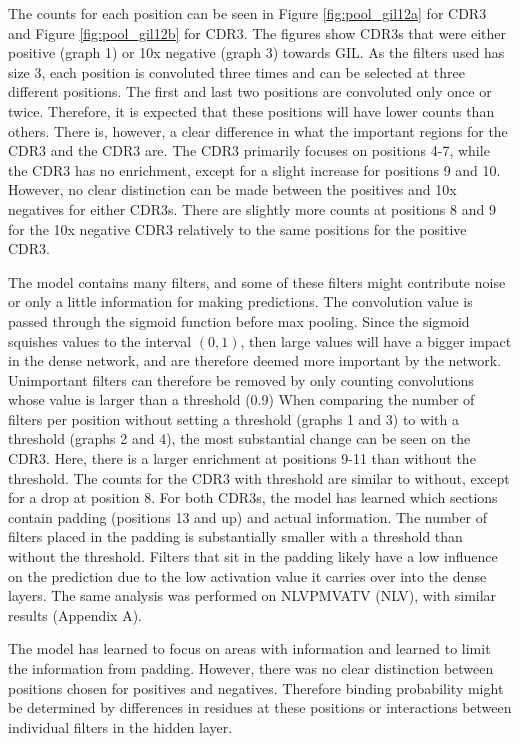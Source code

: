 The counts for each position can be seen in Figure \ref{fig:pool_gil12a} for CDR3{\textalpha} and Figure \ref{fig:pool_gil12b} for CDR3{\textbeta}. The figures show CDR3s that were either positive (graph 1) or 10x negative (graph 3) towards GIL. As the filters used has size 3, each position is convoluted three times and can be selected at three different positions. The first and last two positions are convoluted only once or twice. Therefore, it is expected that these positions will have lower counts than others. There is, however, a clear difference in what the important regions for the CDR3{\textalpha} and the CDR3{\textbeta} are. The CDR3{\textbeta} primarily focuses on positions 4-7, while the CDR3{\textalpha} has no enrichment, except for a slight increase for positions 9 and 10. However, no clear distinction can be made between the positives and 10x negatives for either CDR3s. There are slightly more counts at positions 8 and 9 for the 10x negative CDR3{\textbeta} relatively to the same positions for the positive CDR3{\textbeta}.

The model contains many filters, and some of these filters might contribute noise or only a little information for making predictions. The convolution value is passed through the sigmoid function before max pooling. Since the sigmoid squishes values to the interval $(0 , 1)$, then large values will have a bigger impact in the dense network, and are therefore deemed more important by the network. Unimportant filters can therefore be removed by only counting convolutions whose value is larger than a threshold (0.9) When comparing the number of filters per position without setting a threshold (graphs 1 and 3) to with a threshold (graphs 2 and 4), the most substantial change can be seen on the CDR3{\textalpha}. Here, there is a larger enrichment at positions 9-11 than without the threshold. The counts for the CDR3{\textbeta} with threshold are similar to without, except for a drop at position 8. For both CDR3s, the model has learned which sections contain padding (positions 13 and up) and actual information. The number of filters placed in the padding is substantially smaller with a threshold than without the threshold. Filters that sit in the padding likely have a low influence on the prediction due to the low activation value it carries over into the dense layers. The same analysis was performed on NLVPMVATV (NLV), with similar results (Appendix A).

The model has learned to focus on areas with information and learned to limit the information from padding. However, there was no clear distinction between positions chosen for positives and negatives. Therefore binding probability might be determined by differences in residues at these positions or interactions between individual filters in the hidden layer.

